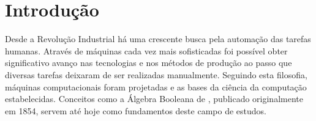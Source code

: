 \documentclass[twoside,english,brazilian]{UNISINOSmonografia}
\begin{document}
%


\tableofcontents


\chapter{Introdução}



	Desde a Revolução Industrial há uma crescente busca pela automação das 
	tarefas humanas. Através de máquinas cada vez mais sofisticadas foi 
	possível obter significativo avanço nas tecnologias e nos métodos de 
	produção ao passo que diversas tarefas deixaram de ser realizadas 
	manualmente.
	Seguindo esta filosofia, máquinas computacionais foram projetadas e as 
	bases da ciência da computação estabelecidas. Conceitos como a 
	Álgebra Booleana de , publicado originalmente em 
	1854, servem até hoje como fundamentos deste campo de estudos.
\end{document}
